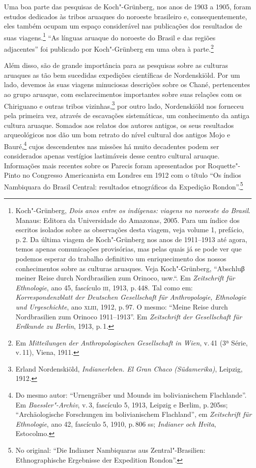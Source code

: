 Uma boa parte das pesquisas de Koch"-Grünberg, nos anos de 1903 a 1905,
foram estudos dedicados às tribos aruaques do noroeste brasileiro e,
consequentemente, eles também ocupam um espaço considerável nas
publicações dos resultados de suas viagens.\footnote{Koch"-Grünberg,
  \textit{Dois anos entre os indígenas: viagens no noroeste do Brasil}. Manaus:
  Editora da Universidade do Amazonas, 2005. Para um índice dos
  escritos isolados sobre as observações desta viagem, veja volume 1,
  prefácio, p.\,2. Da última viagem de Koch"-Grünberg nos anos de
  1911--1913 até agora, temos apenas comunicações provisórias, mas pelas
  quais já se pode ver que podemos esperar do trabalho definitivo um
  enriquecimento dos nossos conhecimentos sobre as culturas aruaques. Veja
  Koch"-Grünberg, ``Abschluβ meiner Reise durch Nordbrasilien zum
  Orinoco, usw.``. Em \textit{Zeitschrift für Ethnologie}, ano 45,
  fascículo \textsc{iii}, 1913, p.\,448. Tal como em: \textit{Korrespondenzblatt
  der Deutschen Gesellschaft für Anthropologie, Ethnologie und
  Urgeschichte}, ano \textsc{xliii}, 1912, p.\,97. O mesmo: ``Meine Reise durch
  Nordbrasilien zum Orinoco 1911--1913''. Em \textit{Zeitschrift der
  Gesellschaft für Erdkunde zu Berlin}, 1913, p.\,1.} ``As
línguas aruaque do noroeste do Brasil e das regiões adjacentes'' foi
publicado por Koch"-Grünberg em uma obra à parte.\footnote{Em
  \textit{Mitteilungen der Anthropologischen Gesellschaft in Wien}, v.\,41
  (3ª Série, v.\,11), Viena, 1911.} %

Além disso, são de grande importância para as pesquisas sobre as
culturas aruaques as tão bem sucedidas expedições científicas de
Nordenskiöld. Por um lado, devemos às suas viagens minuciosas
descrições sobre os Chané, pertencentes ao grupo aruaque, com
esclarecimentos importantes sobre suas relações com os Chiriguano e
outras tribos vizinhas,\footnote{Erland Nordenskiöld,
  \textit{Indianerleben. El Gran Chaco (Südamerika)}, Leipzig, 1912.} por outro
lado, Nordenskiöld nos forneceu pela primeira vez, através de escavações
sistemáticas, um conhecimento da antiga cultura aruaque. Somados aos
relatos dos autores antigos, os seus resultados arqueológicos nos dão um
bom retrato do nível cultural dos antigos Mojo e Bauré,\footnote{Do mesmo
  autor: ``Urnengräber und Mounds im bolivianischem Flachlande''. Em
  \textit{Baessler"-Archiv}, v.\,3, fascículo 5, 1913, Leipzig e Berlim, p.\,205ss; ``Archäologische Forschungen im bolivianischem
  Flachland'', em
  \textit{Zeitschrift für Ethnologie}, ano 42, fascículo 5, 1910, p.\,806
 ss; \textit{Indianer och Hvita}, Estocolmo.} cujos descendentes nas missões há muito decadentes podem
ser considerados apenas vestígios lastimáveis desse centro cultural
aruaque. Informações mais recentes sobre os Parecis foram apresentados
por Roquette"-Pinto no Congresso Americanista em Londres em 1912 com o
título ``Os índios Nambiquara do Brasil Central: resultados etnográficos da Expedição
Rondon''.\footnote{No original: ``Die Indianer Nambiquaras aus Zentral"-Brasilien:
Ethnographische Ergebnisse der Expedition Rondon''.}

